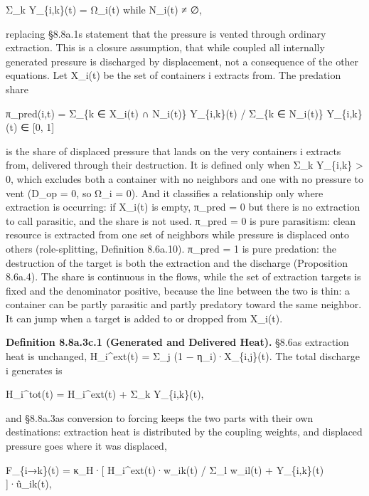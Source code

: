 \documentclass[
]{article}
\begin{document}
Σ\_k Y\_\{i,k\}(t) = Ω\_i(t) while N\_i(t) ≠ ∅,

replacing §8.8a.1\textquotesingle s statement that the pressure is
vented through ordinary extraction. This is a closure assumption, that
while coupled all internally generated pressure is discharged by
displacement, not a consequence of the other equations. Let X\_i(t) be
the set of containers i extracts from. The predation share

π\_pred(i,t) = Σ\_\{k ∈ X\_i(t) ∩ N\_i(t)\} Y\_\{i,k\}(t) / Σ\_\{k ∈
N\_i(t)\} Y\_\{i,k\}(t) ∈ {[}0, 1{]}

is the share of displaced pressure that lands on the very containers i
extracts from, delivered through their destruction. It is defined only
when Σ\_k Y\_\{i,k\} \textgreater{} 0, which excludes both a container
with no neighbors and one with no pressure to vent (D\_op = 0, so Ω\_i =
0). And it classifies a relationship only where extraction is occurring:
if X\_i(t) is empty, π\_pred = 0 but there is no extraction to call
parasitic, and the share is not used. π\_pred = 0 is pure parasitism:
clean resource is extracted from one set of neighbors while pressure is
displaced onto others (role-splitting, Definition 8.6a.10). π\_pred = 1
is pure predation: the destruction of the target is both the extraction
and the discharge (Proposition 8.6a.4). The share is continuous in the
flows, while the set of extraction targets is fixed and the denominator
positive, because the line between the two is thin: a container can be
partly parasitic and partly predatory toward the same neighbor. It can
jump when a target is added to or dropped from X\_i(t).

\textbf{Definition 8.8a.3c.1 (Generated and Delivered Heat).}
§8.6a\textquotesingle s extraction heat is unchanged, H\_i\^{}ext(t) =
Σ\_j (1 − η\_i)·X\_\{i,j\}(t). The total discharge i generates is

H\_i\^{}tot(t) = H\_i\^{}ext(t) + Σ\_k Y\_\{i,k\}(t),

and §8.8a.3a\textquotesingle s conversion to forcing keeps the two parts
with their own destinations: extraction heat is distributed by the
coupling weights, and displaced pressure goes where it was displaced,

F\_\{i→k\}(t) = κ\_H·{[} H\_i\^{}ext(t)·w\_ik(t) / Σ\_l w\_il(t) +
Y\_\{i,k\}(t) {]}·û\_ik(t),
\end{document}
